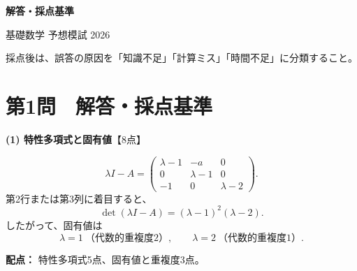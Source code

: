 \thispagestyle{empty}
\vspace*{55mm}
\begin{center}
{\color{white}
{\fontsize{30}{36}\selectfont\bfseries 解答・採点基準\par}
\vspace{8mm}
{\Large 基礎数学 予想模試 2026\par}
\vspace{18mm}
{\large 採点後は、誤答の原因を「知識不足」「計算ミス」「時間不足」に分類すること。\par}
}
\end{center}
\newpage

\section*{第1問　解答・採点基準 }
\begin{solutionbox}
\textbf{(1) 特性多項式と固有値}\hfill【8点】

\[
\lambda I-A=
\begin{pmatrix}
\lambda-1 & -a & 0\\
0 & \lambda-1 & 0\\
-1 & 0 & \lambda-2
\end{pmatrix}.
\]
第2行または第3列に着目すると、
\[
\det(\lambda I-A)=(\lambda-1)^2(\lambda-2).
\]
したがって、固有値は
\[
\boxed{\lambda=1\ \text{（代数的重複度2）},\qquad \lambda=2\ \text{（代数的重複度1）}}.
\]

\textbf{配点：} 特性多項式5点、固有値と重複度3点。
\end{solutionbox}


